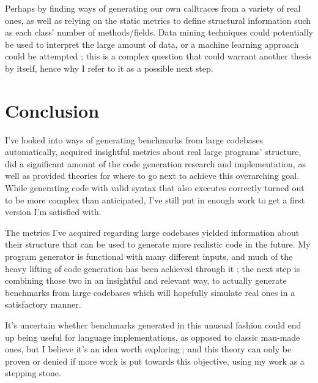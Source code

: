 \documentclass[12pt]{article}
\begin{document}
Perhaps by finding ways of generating our own calltraces from a variety of real ones, as well as relying on the static metrics to define structural information such as each class' number of methods/fields. Data mining techniques could potentially be used to interpret the large amount of data, or a machine learning approach could be attempted ; this is a complex question that could warrant another thesis by itself, hence why I refer to it as a possible next step.

\clearpage
\section{Conclusion}
I've looked into ways of generating benchmarks from large codebases automatically, acquired insightful metrics about real large programs' structure, did a significant amount of the code generation research and implementation, as well as provided theories for where to go next to achieve this overarching goal. While generating code with valid syntax that also executes correctly turned out to be more complex than anticipated, I've still put in enough work to get a first version I'm satisfied with.

The metrics I've acquired regarding large codebases yielded information about their structure that can be used to generate more realistic code in the future. My program generator is functional with many different inputs, and much of the heavy lifting of code generation has been achieved through it ; the next step is combining those two in an insightful and relevant way, to actually generate benchmarks from large codebases which will hopefully simulate real ones in a satisfactory manner.
	

It's uncertain whether benchmarks generated in this unusual fashion could end up being useful for language implementations, as opposed to classic man-made ones, but I believe it's an idea worth exploring ; and this theory can only be proven or denied if more work is put towards this objective, using my work as a stepping stone.

\newpage


\end{document}
